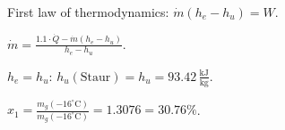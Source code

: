 First law of thermodynamics: \( \dot{m} (h_e - h_u) = W \).  

\( \dot{m} = \frac{1.1 \cdot \dot{Q} - \dot{m} (h_e - h_u)}{h_e - h_u} \).  

\( h_e = h_u \):  
\( h_u (\text{Staur}) = h_u = 93.42 \, \frac{\text{kJ}}{\text{kg}} \).  

\( x_1 = \frac{m_g (-16^\circ \text{C})}{m_g (-16^\circ \text{C})} = 1.3076 = 30.76\% \).